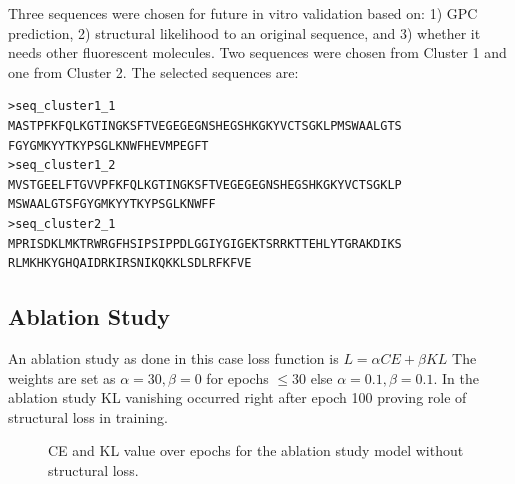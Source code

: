 \documentclass[unnumsec,webpdf,contemporary,medium]{oup-authoring-template}
\begin{document}
Three sequences were chosen for future in vitro validation based on: 1) GPC prediction, 2) structural likelihood to an original sequence, and 3) whether it needs other fluorescent molecules. Two sequences were chosen from Cluster 1 and one from Cluster 2. The selected sequences are:
\begin{verbatim}
>seq_cluster1_1
MASTPFKFQLKGTINGKSFTVEGEGEGNSHEGSHKGKYVCTSGKLPMSWAALGTS
FGYGMKYYTKYPSGLKNWFHEVMPEGFT
>seq_cluster1_2
MVSTGEELFTGVVPFKFQLKGTINGKSFTVEGEGEGNSHEGSHKGKYVCTSGKLP
MSWAALGTSFGYGMKYYTKYPSGLKNWFF
>seq_cluster2_1
MPRISDKLMKTRWRGFHSIPSIPPDLGGIYGIGEKTSRRKTTEHLYTGRAKDIKS
RLMKHKYGHQAIDRKIRSNIKQKKLSDLRFKFVE
\end{verbatim}

\subsection{Ablation Study}\label{subsec:Ablation_study}
An ablation study as done in this case loss function is ${L=\alpha CE+\beta KL}$ The weights are set as $\alpha =30, \beta=0 $ for epochs $\leq 30 $ else $\alpha=0.1, \beta=0.1$. In the ablation study KL vanishing occurred right after epoch 100 proving role of structural loss in training.

\begin{figure}[!ht]
    \centering
    \hfill
    \caption{CE and KL value over epochs for the ablation study model without structural loss.}
    \label{fig:CE_and_KL_over_epochs}
\end{figure}
\end{document}
